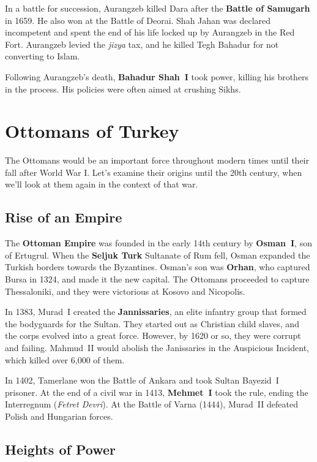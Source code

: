 In a battle for succession, Aurangzeb killed Dara after the \textbf{Battle of Samugarh} in 1659.
He also won at the Battle of Deorai.
Shah Jahan was declared incompetent and spent the end of his life locked up by Aurangzeb in the Red Fort.
Aurangzeb levied the \textit{jizya} tax, and he killed Tegh Bahadur for not converting to Islam.

Following Aurangzeb's death, \textbf{Bahadur Shah~I} took power, killing his brothers in the process.
His policies were often aimed at crushing Sikhs.

\section{Ottomans of Turkey}

The Ottomans would be an important force throughout modern times until their fall after World War I\@.
Let's examine their origins until the 20th century, when we'll look at them again in the context of that war.

\subsection*{Rise of an Empire}

The \textbf{Ottoman Empire} was founded in the early 14th century by \textbf{Osman~I}, son of Ertugrul.
When the \textbf{Seljuk Turk} Sultanate of Rum fell, Osman expanded the Turkish borders towards the Byzantines.
Osman's son was \textbf{Orhan}, who captured Bursa in 1324, and made it the new capital.
The Ottomans proceeded to capture Thessaloniki, and they were victorious at Kosovo and Nicopolis.

In 1383, Murad~I created the \textbf{Jannissaries}, an elite infantry group that formed the bodyguards for the Sultan.
They started out as Christian child slaves, and the corps evolved into a great force.
However, by 1620 or so, they were corrupt and failing.
Mahmud~II would abolish the Janissaries in the Auspicious Incident, which killed over 6,000 of them.

In 1402, Tamerlane won the Battle of Ankara and took Sultan Bayezid~I prisoner.
At the end of a civil war in 1413, \textbf{Mehmet~I} took the rule, ending the Interregnum (\textit{Fetret Devri}).
At the Battle of Varna (1444), Murad~II defeated Polish and Hungarian forces.

\subsection*{Heights of Power}

